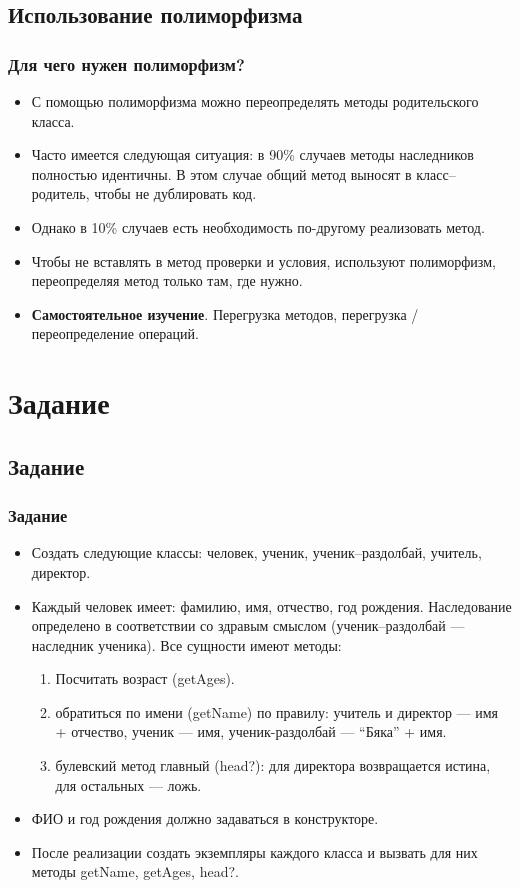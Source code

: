 \documentclass[compress,red]{beamer}
\begin{document}
\subsection{Использование полиморфизма}
\begin{frame}[fragile]
  \frametitle{Для чего нужен полиморфизм?}
  \begin{itemize}
    \item С помощью полиморфизма можно переопределять методы родительского класса.
    \item Часто имеется следующая ситуация: в 90\% случаев методы наследников полностью идентичны. В этом случае общий метод выносят в класс--родитель, чтобы не дублировать код.
    \item Однако в 10\% случаев есть необходимость по-другому реализовать метод.
    \item Чтобы не вставлять в метод проверки и условия, используют полиморфизм, переопределяя метод только там, где нужно.
    \item \textbf{Самостоятельное изучение}. Перегрузка методов, перегрузка / переопределение операций.
  \end{itemize}
\end{frame}

\section{Задание}
\subsection{Задание}
\begin{frame}[fragile]
  \frametitle{Задание}
  \begin{itemize}
    \item Создать следующие классы: человек, ученик, ученик--раздолбай, учитель, директор. 
    \item Каждый человек имеет: фамилию, имя, отчество, год рождения. Наследование определено в соответствии со здравым смыслом (ученик--раздолбай --- наследник ученика). Все сущности имеют методы:
     \begin{enumerate}
      \item Посчитать возраст (getAges).
      \item обратиться по имени (getName) по правилу: учитель и директор --- имя + отчество, ученик --- имя, ученик-раздолбай --- ``Бяка'' + имя. 
      \item булевский метод главный (head?): для директора возвращается истина, для остальных --- ложь.
     \end{enumerate} 
    \item ФИО и год рождения должно задаваться в конструкторе.
    \item После реализации создать экземпляры каждого класса и вызвать для них методы getName, getAges, head?.
  \end{itemize}
\end{frame}
\end{document}
